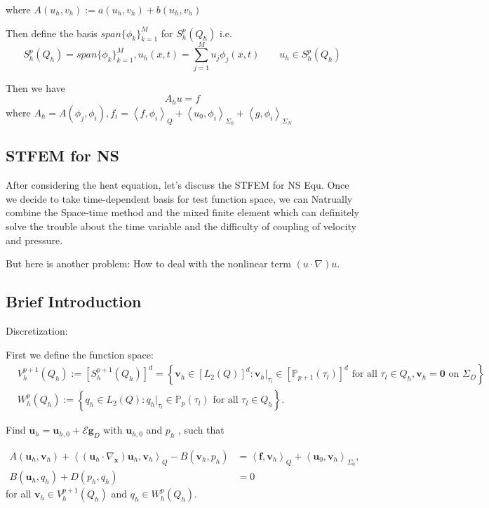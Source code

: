 where
$A\left(u_{h}, v_{h}\right):=a\left(u_{h}, v_{h}\right)+b\left(u_{h}, v_{h}\right)$

Then define the basis $span\{\phi_k\}_{k=1}^M$ for $S_h^p(Q_h)$ i.e.
$$S_h^p(Q_h)=span\{\phi_k\}_{k=1}^M,u_h(x,t)=\sum_{j=1}^{M}u_j\phi_j(x,t)\qquad u_h\in S_h^p(Q_h)$$


Then we have $$A_hu=f$$ where $A_h=A(\phi_j,\phi_i),f_i=\left\langle f, \phi_i\right\rangle_{Q}+\left\langle u_{0}, \phi_i\right\rangle_{\Sigma_{0}}+\left\langle g, \phi_i\right\rangle_{\Sigma_{N}}$

\subsection{STFEM for NS}
After considering the heat equation, let's discuss the STFEM for NS Equ. 
Once we decide to take time-dependent basis for test function space, we can Natrually combine the Space-time method and the mixed finite element which can definitely solve the trouble about the time variable and the difficulty of coupling of 
velocity and pressure.

But here is another problem: How to deal with the nonlinear term $(u\cdot\nabla)u$.
\subsection*{Brief Introduction}
Discretization:

First we define the function space:
$$\begin{aligned}
    &V_{h}^{p+1}\left(Q_h\right) :=\left[S_{h}^{p+1}\left(Q_h\right)\right]^{d} 
    =\left\{\boldsymbol{v}_{h} \in\left[L_{2}(Q)\right]^{d}: \boldsymbol{v}_h|_{\tau_{l}} \in\left[\mathbb{P}_{p+1}\left(\tau_{l}\right)\right]^{d} \text { for all } \tau_{l} \in Q_h, \boldsymbol{v}_{h}=\mathbf{0} \text { on } \Sigma_{D}\right\} \\
    &W_{h}^{p}\left(Q_h\right) :=\left\{q_{h} \in L_{2}(Q): q_h|_{\tau_{l}} \in \mathbb{P}_{p}\left(\tau_{l}\right) \text { for all } \tau_{l} \in Q_h\right\} .
\end{aligned}$$

Find  $\boldsymbol{u}_{h}=\boldsymbol{u}_{h, 0}+\mathcal{E} \boldsymbol{g}_{D}$  with  $\boldsymbol{u}_{h, 0}$  and  $p_{h}$ , such that

$$\begin{aligned}
A\left(\boldsymbol{u}_{h}, \boldsymbol{v}_{h}\right)+\left\langle\left(\boldsymbol{u}_{h} \cdot \nabla_{\boldsymbol{x}}\right) \boldsymbol{u}_{h}, \boldsymbol{v}_{h}\right\rangle_{Q}-B\left(\boldsymbol{v}_{h}, p_{h}\right) & =\left\langle\boldsymbol{f}, \boldsymbol{v}_{h}\right\rangle_{Q}+\left\langle\boldsymbol{u}_{0}, \boldsymbol{v}_{h}\right\rangle_{\Sigma_{0}}, \\
B\left(\boldsymbol{u}_{h}, q_{h}\right)+D\left(p_{h}, q_{h}\right) & =0
\end{aligned}$$
for all  $\boldsymbol{v}_{h} \in V_{h}^{p+1}\left(Q_h\right)$  and  $q_{h} \in W_{h}^{p}\left(Q_h\right)$.

